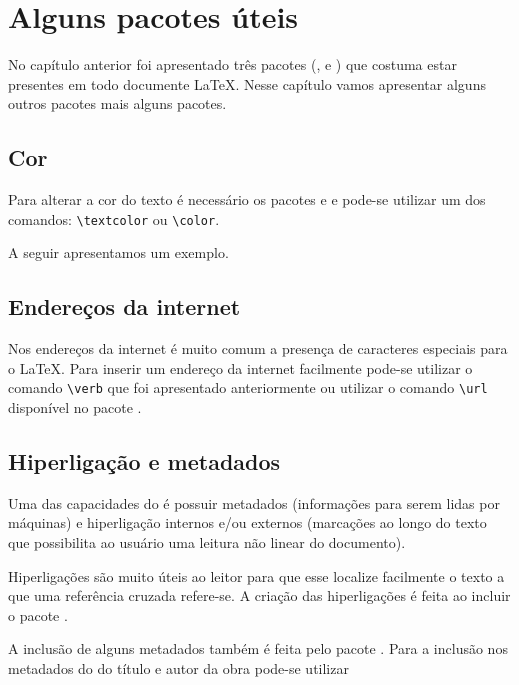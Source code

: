 \chapter{Alguns pacotes úteis}
No capítulo anterior foi apresentado três pacotes (,
 e ) que costuma estar presentes em
todo documente LaTeX. Nesse capítulo vamos apresentar alguns outros pacotes mais
alguns pacotes.

\section{Cor}
Para alterar a cor do texto é necessário os pacotes
 e
 e pode-se utilizar um dos
comandos: \lstinline!\textcolor!
ou \lstinline!\color!.

A seguir apresentamos um exemplo. \\

\section{Endereços da internet}
Nos endereços da internet é muito comum a presença de caracteres especiais para
o LaTeX. Para inserir um endereço da internet facilmente pode-se utilizar o
comando \lstinline!\verb! que foi
apresentado anteriormente ou utilizar o comando
\lstinline!\url! disponível no pacote
.

\section{Hiperligação e metadados}
Uma das capacidades do  é possuir metadados (informações para serem lidas por
máquinas) e hiperligação internos e/ou externos (marcações ao longo do texto que
possibilita ao usuário uma leitura não linear do documento).

Hiperligações são muito úteis ao leitor para que esse localize facilmente o
texto a que uma referência cruzada refere-se. A criação das hiperligações é
feita ao incluir o pacote .

A inclusão de alguns metadados também é feita pelo pacote .
Para a inclusão nos metadados do  do título e autor da obra pode-se utilizar
\begin{code}
\end{code}

